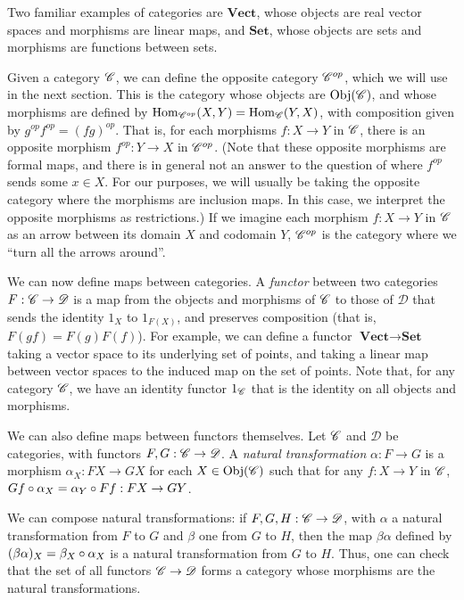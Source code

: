 \documentclass[a4paper,11pt,leqno]{article} \usepackage{amsmath}
\newcommand{\curD}{\mathscr{D}} \newcommand{\curI}{\mathscr{I}}
\newcommand{\Hom}{\ensuremath{\operatorname{Hom}}}
\newcommand{\Obj}{\ensuremath{\operatorname{Obj}}} \newtheorem*{thm}{Theorem}
\theoremstyle{definition} \newtheorem{defn}{Definition}
\begin{document}
Two familiar examples of categories are $\textbf{Vect}$, whose objects are real
vector spaces and morphisms are linear maps, and $\textbf{Set}$, whose objects
are sets and morphisms are functions between sets.

Given a category $\mathscr{C}$, we can define the opposite category $\mathscr{C}^{op}$,
which we will use in the next section.  This is the category whose objects are
$\Obj(\curC)$, and whose morphisms are defined by $\Hom_{\curC^{op}}(X, Y)
= \Hom_{\curC}(Y, X)$, with composition given by $g^{op}f^{op} = (fg)^{op}$.
That is, for each morphisms $f: X\to Y$ in $\mathscr{C}$, there is an opposite
morphism $f^{op}: Y\to X$ in $\mathscr{C}^{op}$.  (Note that these opposite morphisms
are formal maps, and there is in general not an answer to the question of where
$f^{op}$ sends some $x\in X$.  For our purposes, we will usually be taking the
opposite category where the morphisms are inclusion maps.  In this case, we
interpret the opposite morphisms as restrictions.) If we imagine each morphism
$f: X\to Y$ in $\mathscr{C}$ as an arrow between its domain $X$ and codomain $Y$,
$\mathscr{C}^{op}$ is the category where we ``turn all the arrows around''.

We can now define maps between categories.  A \emph{functor} between two
categories $F: \curC\to \curD$ is a map from the objects and morphisms of
$\mathscr{C}$ to those of $\curD$ that sends the identity $1_X$ to $1_{F(X)}$, and
preserves composition (that is, $F(gf) = F(g)F(f)$).  For example, we can define
a functor $\textbf{Vect}\to \textbf{Set}$ taking a vector space to its
underlying set of points, and taking a linear map between vector spaces to the
induced map on the set of points.  Note that, for any category $\mathscr{C}$, we have
an identity functor $1_{\mathscr{C}}$ that is the identity on all objects and morphisms.

We can also define maps between functors themselves.  Let $\mathscr{C}$ and $\curD$ be
categories, with functors $F, G: \curC\to \curD$.  A \emph{natural
transformation} $\alpha: F\to G$ is a morphism $\alpha_X: FX\to GX$ for each
$X\in \Obj(\curC)$ such that for any $f: X\to Y$ in $\mathscr{C}$, $Gf\circ \alpha_X
= \alpha_Y\circ Ff: FX\to GY$.

We can compose natural transformations: if $F, G, H: \curC\to \curD$, with
$\alpha$ a natural transformation from $F$ to $G$ and $\beta$ one from $G$ to
$H$, then the map $\beta\alpha$ defined by $(\beta\alpha)_X = \beta_X\circ
\alpha_X$ is a natural transformation from $G$ to $H$.  Thus, one can check that
the set of all functors $\curC\to\curD$ forms a category whose morphisms are the
natural transformations.
\end{document}

